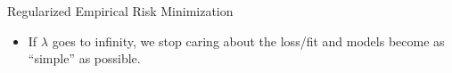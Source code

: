 \documentclass[11pt,compress,t,notes=noshow, xcolor=table]{beamer}
\begin{document}
\begin{vbframe}{Regularized Empirical Risk Minimization}
\begin{itemize}
  \item If $\lambda$ goes to infinity, we stop caring about the loss/fit and models become as \enquote{simple} as possible.
\end{itemize}





\end{vbframe}



\endlecture
\end{document}
